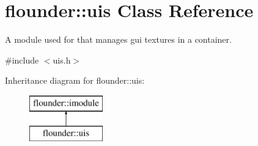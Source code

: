 \hypertarget{classflounder_1_1uis}{}\section{flounder\+:\+:uis Class Reference}
\label{classflounder_1_1uis}


A module used for that manages gui textures in a container.  




{\ttfamily \#include $<$uis.\+h$>$}

Inheritance diagram for flounder\+:\+:uis\+:\begin{figure}[H]
\begin{center}
\leavevmode
\includegraphics[height=2.000000cm]{classflounder_1_1uis}
\end{center}
\end{figure}
